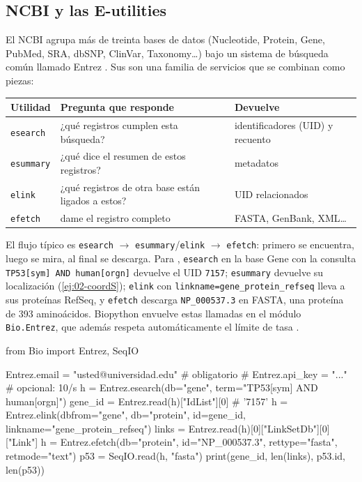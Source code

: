 \subsection{NCBI y las E-utilities}

El NCBI agrupa más de treinta bases de datos (Nucleotide, Protein, Gene, PubMed, SRA, dbSNP, ClinVar, Taxonomy\ldots) bajo un sistema de búsqueda común llamado Entrez \parencite{c02-sayers2025ncbi}. Sus  son una familia de servicios que se combinan como piezas:

\begin{center}
\small
\begin{tabularx}{\linewidth}{@{}lXl@{}}
\toprule
\textbf{Utilidad} & \textbf{Pregunta que responde} & \textbf{Devuelve}\\
\midrule
\texttt{esearch} & ¿qué registros cumplen esta búsqueda? & identificadores (UID) y recuento\\
\texttt{esummary} & ¿qué dice el resumen de estos registros? & metadatos\\
\texttt{elink} & ¿qué registros de otra base están ligados a estos? & UID relacionados\\
\texttt{efetch} & dame el registro completo & FASTA, GenBank, XML\ldots\\
\bottomrule
\end{tabularx}
\end{center}

El flujo típico es \texttt{esearch} $\to$ \texttt{esummary}/\texttt{elink} $\to$ \texttt{efetch}: primero se encuentra, luego se mira, al final se descarga. Para , \texttt{esearch} en la base Gene con la consulta \texttt{TP53[sym] AND human[orgn]} devuelve el UID \texttt{7157}; \texttt{esummary} devuelve su localización (\cref{ej:02-coordS}); \texttt{elink} con \texttt{linkname=gene\_protein\_refseq} lleva a sus proteínas RefSeq, y \texttt{efetch} descarga \texttt{NP\_000537.3} en FASTA, una proteína de 393 aminoácidos. Biopython envuelve estas llamadas en el módulo \texttt{Bio.Entrez}, que además respeta automáticamente el límite de tasa \parencite{c02-cock2009}.

\begin{codigo}[entrez\_tp53.py]
from Bio import Entrez, SeqIO

Entrez.email = "usted@universidad.edu"       # obligatorio
# Entrez.api_key = "..."                      # opcional: 10/s
h = Entrez.esearch(db="gene", term="TP53[sym] AND human[orgn]")
gene_id = Entrez.read(h)["IdList"][0]        # '7157'
h = Entrez.elink(dbfrom="gene", db="protein", id=gene_id,
                 linkname="gene_protein_refseq")
links = Entrez.read(h)[0]["LinkSetDb"][0]["Link"]
h = Entrez.efetch(db="protein", id="NP_000537.3",
                  rettype="fasta", retmode="text")
p53 = SeqIO.read(h, "fasta")
print(gene_id, len(links), p53.id, len(p53))
\end{codigo}

